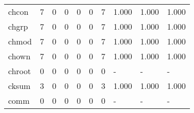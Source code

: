 \begin{longtable}{lp{2.0cm}p{2.0cm}p{2.0cm}p{2.0cm}p{2.0cm}p{2.0cm}p{2.0cm}p{2.0cm}p{2.0cm}}
chcon     &                      7 &                                  0 &                                 0 &                                0 &                                 0 &                               7 &                                1.000 &                                  1.000 &                                1.000 \\
chgrp     &                      7 &                                  0 &                                 0 &                                0 &                                 0 &                               7 &                                1.000 &                                  1.000 &                                1.000 \\
chmod     &                      7 &                                  0 &                                 0 &                                0 &                                 0 &                               7 &                                1.000 &                                  1.000 &                                1.000 \\
chown     &                      7 &                                  0 &                                 0 &                                0 &                                 0 &                               7 &                                1.000 &                                  1.000 &                                1.000 \\
chroot    &                      0 &                                  0 &                                 0 &                                0 &                                 0 &                               0 &                                    - &                                      - &                                    - \\
cksum     &                      3 &                                  0 &                                 0 &                                0 &                                 0 &                               3 &                                1.000 &                                  1.000 &                                1.000 \\
comm      &                      0 &                                  0 &                                 0 &                                0 &                                 0 &                               0 &                                    - &                                      - &                                    - \\

\end{longtable}
